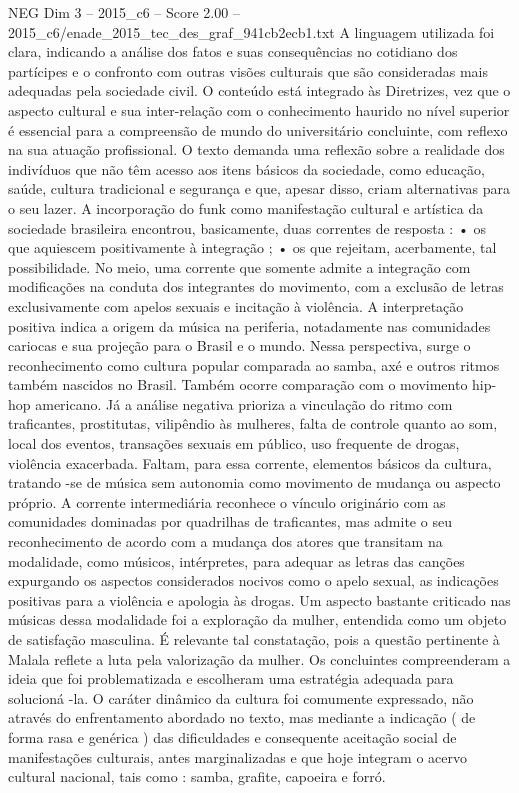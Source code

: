 \begin{textsample}{NEG Dim 3 – 2015\_c6 – Score 2.00 – 2015\_c6/enade\_2015\_tec\_des\_graf\_941cb2ecb1.txt}
A linguagem utilizada foi clara, indicando a análise dos fatos e suas consequências no cotidiano dos partícipes e o confronto com outras visões culturais que são consideradas mais adequadas pela sociedade civil.
O conteúdo está integrado às Diretrizes, vez que o aspecto cultural e sua inter-relação com o conhecimento haurido no nível superior é essencial para a compreensão de mundo do universitário concluinte, com reflexo na sua atuação profissional.
O texto demanda uma reflexão sobre a realidade dos indivíduos que não têm acesso aos itens básicos da sociedade, como educação, saúde, cultura tradicional e segurança e que, apesar disso, criam alternativas para o seu lazer.
A incorporação do funk como manifestação cultural e artística da sociedade brasileira encontrou, basicamente, duas correntes de resposta : • os que aquiescem positivamente à integração ; • os que rejeitam, acerbamente, tal possibilidade.
No meio, uma corrente que somente admite a integração com modificações na conduta dos integrantes do movimento, com a exclusão de letras exclusivamente com apelos sexuais e incitação à violência.
A interpretação positiva indica a origem da música na periferia, notadamente nas comunidades cariocas e sua projeção para o Brasil e o mundo.
Nessa perspectiva, surge o reconhecimento como cultura popular comparada ao samba, axé e outros ritmos também nascidos no Brasil.
Também ocorre comparação com o movimento hip-hop americano.
Já a análise negativa prioriza a vinculação do ritmo com traficantes, prostitutas, vilipêndio às mulheres, falta de controle quanto ao som, local dos eventos, transações sexuais em público, uso frequente de drogas, violência exacerbada.
Faltam, para essa corrente, elementos básicos da cultura, tratando -se de música sem autonomia como movimento de mudança ou aspecto próprio.
A corrente intermediária reconhece o vínculo originário com as comunidades dominadas por quadrilhas de traficantes, mas admite o seu reconhecimento de acordo com a mudança dos atores que transitam na modalidade, como músicos, intérpretes, para adequar as letras das canções expurgando os aspectos considerados nocivos como o apelo sexual, as indicações positivas para a violência e apologia às drogas.
Um aspecto bastante criticado nas músicas dessa modalidade foi a exploração da mulher, entendida como um objeto de satisfação masculina.
É relevante tal constatação, pois a questão pertinente à Malala reflete a luta pela valorização da mulher.
Os concluintes compreenderam a ideia que foi problematizada e escolheram uma estratégia adequada para solucioná -la.
O caráter dinâmico da cultura foi comumente expressado, não através do enfrentamento abordado no texto, mas mediante a indicação ( de forma rasa e genérica ) das dificuldades e consequente aceitação social de manifestações culturais, antes marginalizadas e que hoje integram o acervo cultural nacional, tais como : samba, grafite, capoeira e forró.

\end{textsample}
